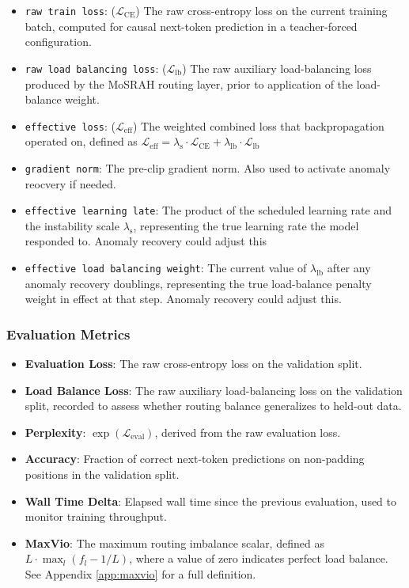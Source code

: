 \documentclass[11pt]{article}
\begin{document}
\begin{itemize}


    \item \texttt{raw train loss}: ($\mathcal{L}_\mathrm{CE}$) The raw cross-entropy loss on the current training batch,
    computed for causal next-token prediction in a teacher-forced configuration.
    \item \texttt{raw load balancing loss}: ($\mathcal{L}_\mathrm{lb}$) The raw auxiliary load-balancing loss produced by
    the MoSRAH routing layer, prior to application of the load-balance weight.
    \item \texttt{effective loss}: ($\mathcal{L}_\mathrm{eff}$) The weighted combined loss that backpropagation
    operated on, defined as $\mathcal{L}_\mathrm{eff} = \lambda_\mathrm{s} \cdot \mathcal{L}_\mathrm{CE}
        + \lambda_\mathrm{lb} \cdot \mathcal{L}_\mathrm{lb}$
    \item \texttt{gradient norm}: The pre-clip gradient norm. Also used to activate anomaly reocvery if needed.
    \item \texttt{effective learning late}: The product of the scheduled learning rate
    and the instability scale $\lambda_\mathrm{s}$, representing the true learning rate
    the model responded to. Anomaly recovery could adjust this
    \item \texttt{effective load balancing weight}: The current value of
    $\lambda_\mathrm{lb}$ after any anomaly recovery doublings, representing the true
    load-balance penalty weight in effect at that step. Anomaly recovery could adjust this.
\end{itemize}

\subsubsection{Evaluation Metrics}

\begin{itemize}
    \item \textbf{Evaluation Loss}: The raw cross-entropy loss on the validation split.

    \item \textbf{Load Balance Loss}: The raw auxiliary load-balancing loss on the
    validation split, recorded to assess whether routing balance generalizes to
    held-out data.

    \item \textbf{Perplexity}: $\exp(\mathcal{L}_\mathrm{eval})$, derived from the
    raw evaluation loss.

    \item \textbf{Accuracy}: Fraction of correct next-token predictions on non-padding
    positions in the validation split.

    \item \textbf{Wall Time Delta}: Elapsed wall time since the previous evaluation,
    used to monitor training throughput.

    \item \textbf{MaxVio}: The maximum routing imbalance scalar, defined as
    $L \cdot \max_l(f_l - 1/L)$, where a value of zero indicates perfect load balance.
    See Appendix \ref{app:maxvio} for a full definition.
\end{itemize}
\end{document}
